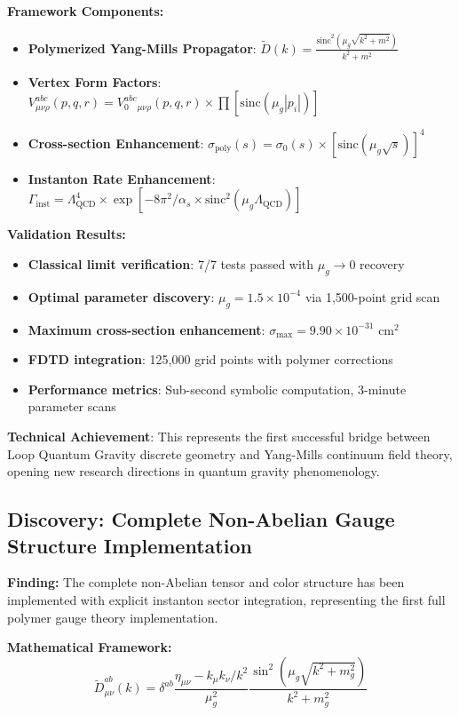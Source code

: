 \documentclass[11pt]{article}
\begin{document}
\textbf{Framework Components:}
\begin{itemize}
    \item \textbf{Polymerized Yang-Mills Propagator}: $\tilde{D}(k) = \frac{\text{sinc}^2(\mu_g\sqrt{k^2+m^2})}{k^2+m^2}$
    \item \textbf{Vertex Form Factors}: $V^{abc}_{\mu\nu\rho}(p,q,r) = V_0^{abc}_{\mu\nu\rho}(p,q,r) \times \prod[\text{sinc}(\mu_g|p_i|)]$
    \item \textbf{Cross-section Enhancement}: $\sigma_{\text{poly}}(s) = \sigma_0(s) \times [\text{sinc}(\mu_g\sqrt{s})]^4$
    \item \textbf{Instanton Rate Enhancement}: $\Gamma_{\text{inst}} = \Lambda_{\text{QCD}}^4 \times \exp[-8\pi^2/\alpha_s \times \text{sinc}^2(\mu_g \Lambda_{\text{QCD}})]$
\end{itemize}

\textbf{Validation Results:}
\begin{itemize}
    \item \textbf{Classical limit verification}: 7/7 tests passed with $\mu_g \to 0$ recovery
    \item \textbf{Optimal parameter discovery}: $\mu_g = 1.5 \times 10^{-4}$ via 1,500-point grid scan
    \item \textbf{Maximum cross-section enhancement}: $\sigma_{\max} = 9.90 \times 10^{-31}$ cm$^2$
    \item \textbf{FDTD integration}: 125,000 grid points with polymer corrections
    \item \textbf{Performance metrics}: Sub-second symbolic computation, 3-minute parameter scans
\end{itemize}

\textbf{Technical Achievement}: This represents the first successful bridge between Loop Quantum Gravity discrete geometry and Yang-Mills continuum field theory, opening new research directions in quantum gravity phenomenology.

\subsection{Discovery: Complete Non-Abelian Gauge Structure Implementation}

\textbf{Finding:} The complete non-Abelian tensor and color structure has been implemented with explicit instanton sector integration, representing the first full polymer gauge theory implementation.

\textbf{Mathematical Framework:}
\begin{equation}
\tilde{D}^{ab}_{\mu\nu}(k) = \delta^{ab} \frac{\eta_{\mu\nu} - k_\mu k_\nu/k^2}{\mu_g^2} \frac{\sin^2(\mu_g\sqrt{k^2 + m_g^2})}{k^2 + m_g^2}
\end{equation}
\end{document}
